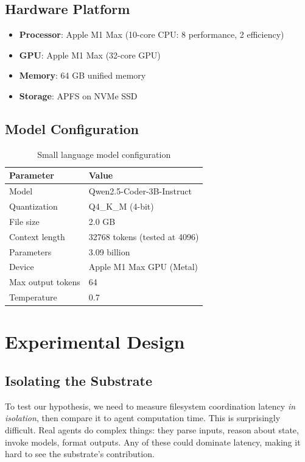 \documentclass[11pt]{article}
\begin{document}
\subsection{Hardware Platform}

\begin{itemize}
\item \textbf{Processor}: Apple M1 Max (10-core CPU: 8 performance, 2 efficiency)
\item \textbf{GPU}: Apple M1 Max (32-core GPU)
\item \textbf{Memory}: 64 GB unified memory
\item \textbf{Storage}: APFS on NVMe SSD
\end{itemize}

\subsection{Model Configuration}

\begin{table}[h]
\centering
\begin{tabular}{ll}
\toprule
\textbf{Parameter} & \textbf{Value} \\
\midrule
Model & Qwen2.5-Coder-3B-Instruct \\
Quantization & Q4\_K\_M (4-bit) \\
File size & 2.0 GB \\
Context length & 32768 tokens (tested at 4096) \\
Parameters & 3.09 billion \\
Device & Apple M1 Max GPU (Metal) \\
Max output tokens & 64 \\
Temperature & 0.7 \\
\bottomrule
\end{tabular}
\caption{Small language model configuration}
\label{tab:model}
\end{table}

\section{Experimental Design}

\subsection{Isolating the Substrate}

To test our hypothesis, we need to measure filesystem coordination latency \emph{in isolation}, then compare it to agent computation time. This is surprisingly difficult. Real agents do complex things: they parse inputs, reason about state, invoke models, format outputs. Any of these could dominate latency, making it hard to see the substrate's contribution.
\end{document}
